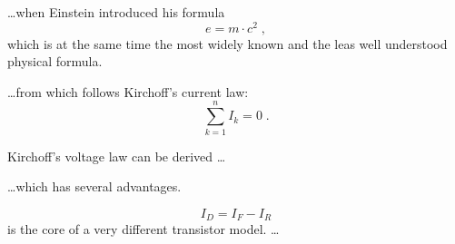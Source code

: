 \documentclass{article}
\begin{document}
\ldots when Einstein introduced his formula
\begin{equation}
   e = m \cdot c^2 \; ,
\end{equation}
which is at the same time the most widely known
and the leas well understood physical formula.

\ldots from which follows Kirchoff's current law:
\begin{equation}
   \sum_{k=1}^{n} I_k = 0 \; .
\end{equation}

Kirchoff's voltage law can be derived \ldots

\ldots which has several advantages.

\begin{equation}
   I_D = I_F - I_R
\end{equation}
is the core of a very different transistor model. \ldots
\end{document}

